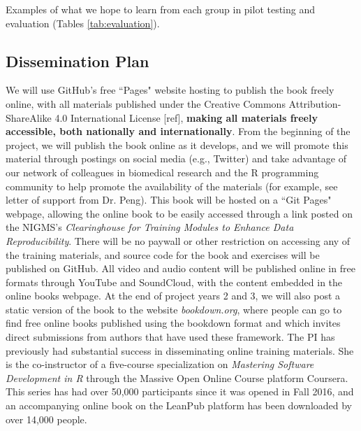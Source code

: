 \documentclass[pdftex,english,11pt,parskip=half]{scrartcl}
\begin{document}
Examples of what we hope to learn from each group in pilot testing and evaluation (Tables \ref{tab:evaluation}).

\subsection{Dissemination Plan}

We will use GitHub's free ``Pages" website hosting to publish the book freely online, with all materials published under the Creative Commons Attribution-ShareAlike 4.0 International License [ref], \textbf{making all materials freely accessible, both nationally and internationally}. From the beginning of the project, we will publish the book online as it develops, and we will promote this material through postings on social media (e.g., Twitter) and take advantage of our network of colleagues in biomedical research and the R programming community to help promote the availability of the materials (for example, see letter of support from Dr. Peng). This book will be hosted on a ``Git Pages" webpage, allowing the online book to be easily accessed through a link posted on the NIGMS's \textit{Clearinghouse for Training Modules to Enhance Data Reproducibility}. There will be no paywall or other restriction on accessing any of the training materials, and source code for the book and exercises will be published on GitHub. All video and audio content will be published online in free formats through YouTube and SoundCloud, with the content embedded in the online books webpage. At the end of project years 2 and 3, we will also post a static version of the book to the website \textit{bookdown.org}, where people can go to find free online books published using the bookdown format and which invites direct submissions from authors that have used these framework. The PI has previously had substantial success in disseminating online training materials. She is the co-instructor of a five-course specialization on \textit{Mastering Software Development in R} through the Massive Open Online Course platform Coursera. This series has had over 50,000 participants since it was opened in Fall 2016, and an accompanying online book on the LeanPub platform has been downloaded by over 14,000 people.
\end{document}
